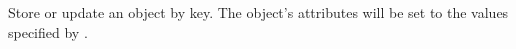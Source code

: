 Store or update an object by key.  The object's attributes will be set to the
values specified by .

